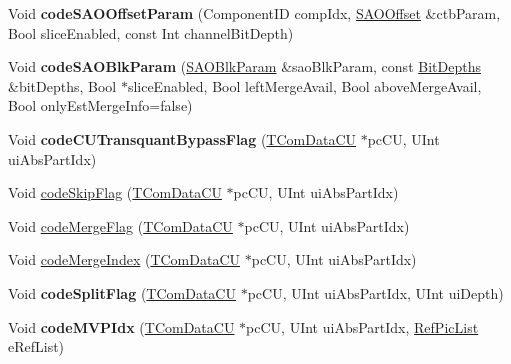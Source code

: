 \begin{DoxyCompactItemize}
\item 
\mbox{\label{class_t_enc_sbac_a03ef58d854c4592518df86fbcded8db1}} 
Void {\bfseries code\+S\+A\+O\+Offset\+Param} (Component\+ID comp\+Idx, \hyperlink{struct_s_a_o_offset}{S\+A\+O\+Offset} \&ctb\+Param, Bool slice\+Enabled, const Int channel\+Bit\+Depth)
\item 
\mbox{\label{class_t_enc_sbac_acede31c4b80a04aa93ec256bc524969d}} 
Void {\bfseries code\+S\+A\+O\+Blk\+Param} (\hyperlink{struct_s_a_o_blk_param}{S\+A\+O\+Blk\+Param} \&sao\+Blk\+Param, const \hyperlink{struct_bit_depths}{Bit\+Depths} \&bit\+Depths, Bool $\ast$slice\+Enabled, Bool left\+Merge\+Avail, Bool above\+Merge\+Avail, Bool only\+Est\+Merge\+Info=false)
\item 
\mbox{\label{class_t_enc_sbac_a05fa1be24de1add262d021fdb7a6f2c9}} 
Void {\bfseries code\+C\+U\+Transquant\+Bypass\+Flag} (\hyperlink{class_t_com_data_c_u}{T\+Com\+Data\+CU} $\ast$pc\+CU, U\+Int ui\+Abs\+Part\+Idx)
\item 
Void \hyperlink{class_t_enc_sbac_a5c9fdfcd499e653a46457d376a0b8680}{code\+Skip\+Flag} (\hyperlink{class_t_com_data_c_u}{T\+Com\+Data\+CU} $\ast$pc\+CU, U\+Int ui\+Abs\+Part\+Idx)
\item 
Void \hyperlink{class_t_enc_sbac_a58b3edb1ed81b4ded7327d2ca928eb0e}{code\+Merge\+Flag} (\hyperlink{class_t_com_data_c_u}{T\+Com\+Data\+CU} $\ast$pc\+CU, U\+Int ui\+Abs\+Part\+Idx)
\item 
Void \hyperlink{class_t_enc_sbac_ae0cf04853ab89940fe507d17d2fb7127}{code\+Merge\+Index} (\hyperlink{class_t_com_data_c_u}{T\+Com\+Data\+CU} $\ast$pc\+CU, U\+Int ui\+Abs\+Part\+Idx)
\item 
\mbox{\label{class_t_enc_sbac_a533fe69d8ddde4746c62739917bb38bf}} 
Void {\bfseries code\+Split\+Flag} (\hyperlink{class_t_com_data_c_u}{T\+Com\+Data\+CU} $\ast$pc\+CU, U\+Int ui\+Abs\+Part\+Idx, U\+Int ui\+Depth)
\item 
\mbox{\label{class_t_enc_sbac_aa58110394a52c1cb993ba77effb57f4c}} 
Void {\bfseries code\+M\+V\+P\+Idx} (\hyperlink{class_t_com_data_c_u}{T\+Com\+Data\+CU} $\ast$pc\+CU, U\+Int ui\+Abs\+Part\+Idx, \hyperlink{_type_def_8h_a93cea48eb9dcfd661168dee82e41b384}{Ref\+Pic\+List} e\+Ref\+List)
\item 

\end{DoxyCompactItemize}
